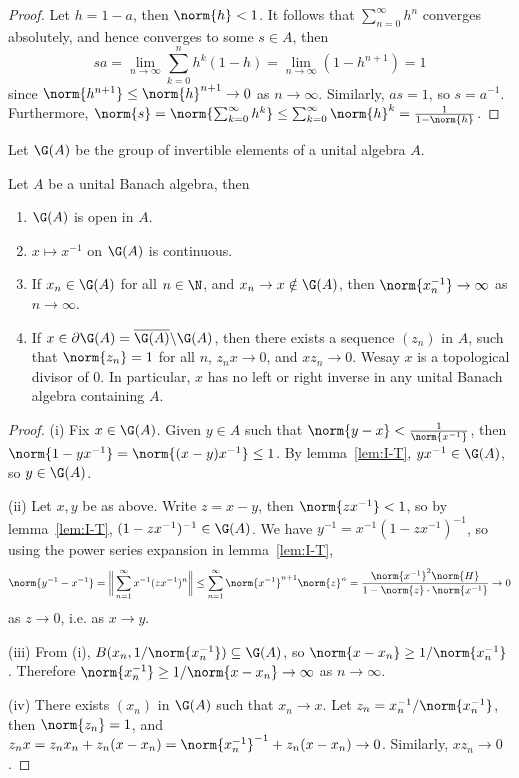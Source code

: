 \documentclass[a4paper]{article}
\begin{document}
\begin{proof}
  Let $h=1-a$, then $\norm{h}<1$. It follows that $\sum_{n=0}^\infty h^n$ converges absolutely, and hence converges to some $s\in A$, then
  \[
    sa=\lim_{n\to\infty}\sum_{k=0}^n h^k(1-h)=\lim_{n\to\infty}(1-h^{n+1})=1
  \]
  since $\norm{h^{n+1}}\leq\norm{h}^{n+1}\to 0$ as $n\to\infty$. Similarly, $as=1$, so $s=a^{-1}$. Furthermore, $\norm{s}=\norm{\sum_{k=0}^\infty h^k}\leq\sum_{k=0}^\infty\norm{h}^k=\frac{1}{1-\norm{h}}$.
\end{proof}

\noindent Let $\G(A)$ be the group of invertible elements of a unital algebra $A$.

\begin{ncor}\label{cor:G(X)}
	Let $A$ be a unital Banach algebra, then
	\begin{enumerate}[label=(\roman*)]
		\item $\G(A)$ is open in $A$.
		\item $x\mapsto x^{-1}$ on $\G(A)$ is continuous.
		\item If $x_n\in\G(A)$ for all $n\in\N$, and $x_n\to x\notin\G(A)$, then $\norm{x_n^{-1}}\to\infty$ as $n\to\infty$.
		\item If $x\in\partial\G(A)=\overline{\G(A)}\backslash\G(A)$, then there exists a sequence $(z_n)$ in $A$, such that $\norm{z_n}=1$ for all $n$, $z_n x\to 0$, and $x z_n\to 0$. Wesay $x$ is a topological divisor of 0. In particular, $x$ has no left or right inverse in any unital Banach algebra containing $A$.
	\end{enumerate}
\end{ncor}

\begin{proof}
	(i) Fix $x\in\G(A)$. Given $y\in A$ such that $\norm{y-x}<\frac{1}{\norm{x^{-1}}}$, then $\norm{1-yx^{-1}}=\norm{(x-y)x^{-1}}\leq 1$. By lemma~\ref{lem:I-T}, $yx^{-1}\in\G(A)$, so $y\in\G(A)$.

	(ii) Let $x,y$ be as above. Write $z=x-y$, then $\norm{zx^{-1}}<1$, so by lemma~\ref{lem:I-T}, $(1-zx^{-1})^{-1}\in\G(A)$. We have $y^{-1}=x^{-1}(1-zx^{-1})^{-1}$, so using the power series expansion in lemma~\ref{lem:I-T},
	\[\norm{y^{-1}-x^{-1}}=\bigg\|\sum_{n=1}^\infty x^{-1}(zx^{-1})^n\bigg\|\leq\sum_{n=1}^\infty\norm{x^{-1}}^{n+1}\norm{z}^n= \frac{\norm{x^{-1}}^2\norm{H}}{1-\norm{z}\cdot\norm{x^{-1}}}\to 0\]
	as $z\to 0$, i.e. as $x\to y$.

	(iii) From (i), $B(x_n,1/\norm{x_n^{-1}})\subseteq\G(A)$, so $\norm{x-x_n}\geq 1/\norm{x_n^{-1}}$. Therefore $\norm{x_n^{-1}}\geq 1/\norm{x-x_n}\to\infty$ as $n\to\infty$.

	(iv) There exists $(x_n)$ in $\G(A)$ such that $x_n\to x$. Let $z_n=x_n^{-1}/\norm{x_n^{-1}}$, then $\norm{z_n}=1$, and $z_nx=z_nx_n+z_n(x-x_n)=\norm{x_n^{-1}}^{-1}+z_n(x-x_n)\to 0$. Similarly, $xz_n\to 0$.
\end{proof}
\end{document}
